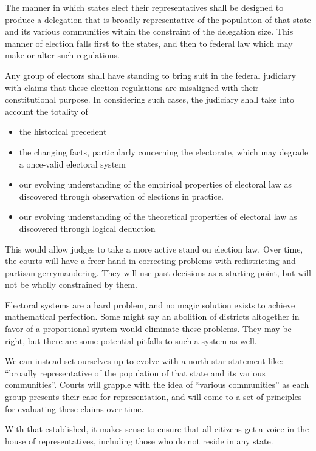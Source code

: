 \documentclass{article}
\begin{document}
\begin{quoting}
The manner in which states elect their representatives shall be designed to produce a delegation that is broadly representative of the population of that state and its various communities within the constraint of the delegation size. This manner of election falls first to the states, and then to federal law which may make or alter such regulations.

Any group of electors shall have standing to bring suit in the federal judiciary with claims that these election regulations are misaligned with their constitutional purpose. In considering such cases, the judiciary shall take into account the totality of
\begin{itemize}
\item the historical precedent
\item the changing facts, particularly concerning the electorate, which may degrade a once-valid electoral system
\item our evolving understanding of the empirical properties of electoral law as discovered through observation of elections in practice.
\item our evolving understanding of the theoretical properties of electoral law as discovered through logical deduction
\end{itemize}
\end{quoting}

This would allow judges to take a more active stand on election law. Over time, the courts will have a freer hand in correcting problems with redistricting and partisan gerrymandering. They will use past decisions as a starting point, but will not be wholly constrained by them.

Electoral systems are a hard problem, and no magic solution exists to achieve mathematical perfection. Some might say an abolition of districts altogether in favor of a proportional system would eliminate these problems. They may be right, but there are some potential pitfalls to such a system as well.

We can instead set ourselves up to evolve with a north star statement like: “broadly representative of the population of that state and its various communities”. Courts will grapple with the idea of “various communities” as each group presents their case for representation, and will come to a set of principles for evaluating these claims over time.

With that established, it makes sense to ensure that all citizens get a voice in the house of representatives, including those who do not reside in any state.
\end{document}
